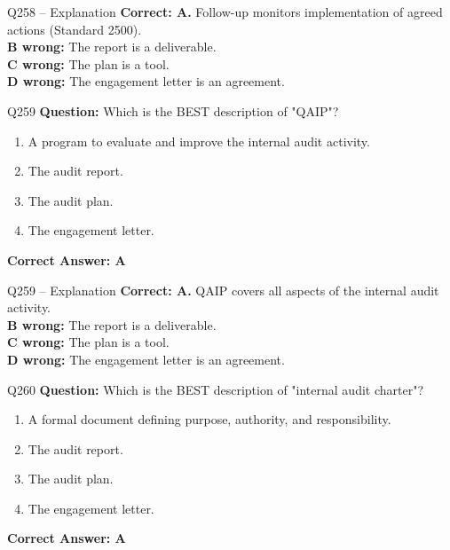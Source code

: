 \documentclass[aspectratio=169,10pt]{beamer}
\begin{document}
	\begin{frame}[t]{Q258 -- Explanation}
		\small
		\textbf{Correct: A.} Follow-up monitors implementation of agreed actions (Standard 2500). \\[4pt]
		\textbf{B wrong:} The report is a deliverable. \\[2pt]
		\textbf{C wrong:} The plan is a tool. \\[2pt]
		\textbf{D wrong:} The engagement letter is an agreement.
	\end{frame}
	
	\begin{frame}[t]{Q259}
		\small
		\textbf{Question:} Which is the BEST description of "QAIP"?
		\begin{enumerate}[label=\Alph*.,itemsep=1pt,topsep=2pt]
			\item A program to evaluate and improve the internal audit activity.
			\item The audit report.
			\item The audit plan.
			\item The engagement letter.
		\end{enumerate}
		\vspace{4pt}
		\textbf{Correct Answer: A}
	\end{frame}
	
	\begin{frame}[t]{Q259 -- Explanation}
		\small
		\textbf{Correct: A.} QAIP covers all aspects of the internal audit activity. \\[4pt]
		\textbf{B wrong:} The report is a deliverable. \\[2pt]
		\textbf{C wrong:} The plan is a tool. \\[2pt]
		\textbf{D wrong:} The engagement letter is an agreement.
	\end{frame}
	
	\begin{frame}[t]{Q260}
		\small
		\textbf{Question:} Which is the BEST description of "internal audit charter"?
		\begin{enumerate}[label=\Alph*.,itemsep=1pt,topsep=2pt]
			\item A formal document defining purpose, authority, and responsibility.
			\item The audit report.
			\item The audit plan.
			\item The engagement letter.
		\end{enumerate}
		\vspace{4pt}
		\textbf{Correct Answer: A}
	\end{frame}
	
\end{document}
